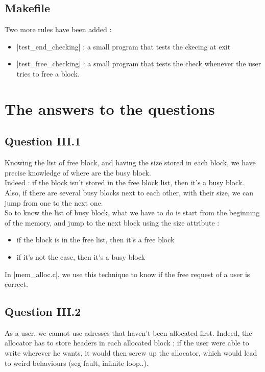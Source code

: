 \documentclass[twoside]{article}
\begin{document}
\subsection{Makefile}
Two more rules have been added :
\begin{itemize}
	\item |test_end_checking| : a small program that tests the ckecing at exit
	\item |test_free_checking| : a small program that tests the check whenever
		the user tries to free a block.
\end{itemize}

\section{The answers to the questions}
\subsection{Question III.1}
Knowing the list of free block, and having the size stored in each block,
we have precise knowledge of where are the busy block.\\

Indeed : if the block isn't stored in the free block list, then it's a busy
block. Also, if there are several busy blocks next to each other, with their
size, we can jump from one to the next one.\\

So to know the list of busy block, what we have to do is start from the
beginning of the memory, and jump to the next block using the size attribute :
\begin{itemize}
	\item if the block is in the free list, then it's a free block
	\item if it's not the case, then it's a busy block
\end{itemize}

In |mem_alloc.c|, we use this technique to know if the free request of a user
is correct.

\subsection{Question III.2}
As a user, we cannot use adresses that haven't been allocated first. Indeed,
the allocator has to store headers in each allocated block ; if the user were
able to write wherever he wants, it would then screw up the allocator, which
would lead to weird behaviours (seg fault, infinite loop..).\\
\end{document}
